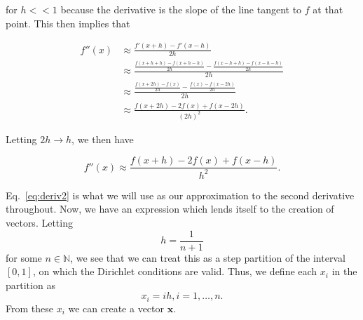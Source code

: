 \documentclass[12pt]{article}
\numberwithin{equation}{section}
\begin{document}
\noindent for $h<<1$ because the derivative is the slope of the line tangent to $f$ at that point.  This then implies that

\begin{equation}
\begin{align}
f''\left(x\right)&\approx\frac{f'\left(x+h\right)-f'\left(x-h\right)}{2h} \\
&\approx\frac{\frac{f\left(x+h+h\right)-f\left(x+h-h\right)}{2h} - \frac{f\left(x-h+h\right)-f\left(x-h-h\right)}{2h}}{2h} \\
&\approx\frac{\frac{f\left(x+2h\right)-f\left(x\right)}{2h} - \frac{f\left(x\right)-f\left(x-2h\right)}{2h}}{2h} \\
&\approx\frac{f\left(x+2h\right)-2f\left(x\right)+f\left(x-2h\right)}{\left(2h\right)^{2}}.
\end{align}
\end{equation}

\noindent Letting $2h\rightarrow h$, we then have

\begin{equation}
\label{eq:deriv2}
f''\left(x\right)\approx\frac{f\left(x+h\right)-2f\left(x\right)+f\left(x-h\right)}{h^{2}}.
\end{equation}

\noindent Eq.~\ref{eq:deriv2} is what we will use as our approximation to the second derivative throughout.  
\indent Now, we have an expression which lends itself to the creation of vectors.  Letting $$h = \frac{1}{n+1}$$ for some $n\in\mathbb{N}$, we see that we can treat this as a step partition of the interval $\left[0,1\right]$, on which the Dirichlet conditions are valid.  Thus, we define each $x_{i}$ in the partition as $$x_{i}=ih,i=1,\ldots,n.$$  From these $x_{i}$ we can create a vector $\textbf{x}$.
\end{document}
